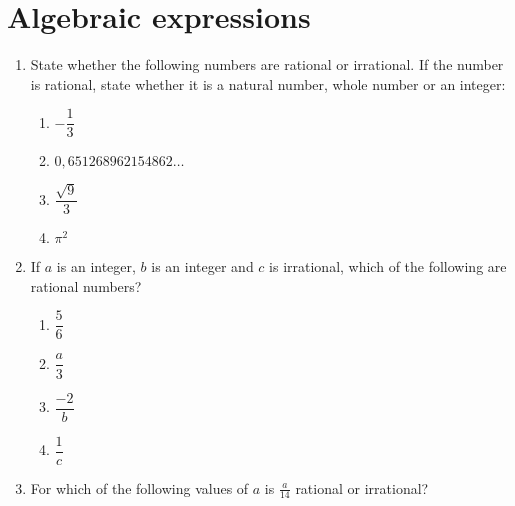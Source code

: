 \chapter{Algebraic expressions}
\begin{exercises}{}{
\begin{enumerate}[itemsep=5pt, label=\textbf{\arabic*}. ] 
\item State whether the following numbers are rational or irrational. If the number is rational, state whether it is a natural number, whole number or an integer:
\begin{enumerate}[itemsep=5pt, label=\textbf{(\alph*)} ] 
    \item $-\dfrac{1}{3}$
    \item $0,651268962154862\ldots$
    \item $\dfrac{\sqrt{9}}{3}$
    \item $\pi^2$
\end{enumerate}


\item If $a$ is an integer, $b$ is an integer and $c$ is irrational, which of the following are rational numbers? 
  \begin{enumerate}[itemsep=5pt, label=\textbf{(\alph*)} ] 
    \item $\dfrac{5}{6}$
    \item $\dfrac{a}{3}$
    \item $\dfrac{-2}{b}$
    \item $\dfrac{1}{c}$
    \end{enumerate}
\item For which of the following values of $a$ is $\frac{a}{14}$ rational or irrational?


\end{enumerate}}
\end{exercises}
